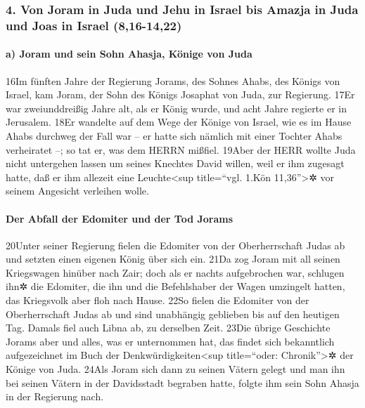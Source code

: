 \hypertarget{von-joram-in-juda-und-jehu-in-israel-bis-amazja-in-juda-und-joas-in-israel-816-1422}{%
\subsubsection{4. Von Joram in Juda und Jehu in Israel bis Amazja in
Juda und Joas in Israel
(8,16-14,22)}\label{von-joram-in-juda-und-jehu-in-israel-bis-amazja-in-juda-und-joas-in-israel-816-1422}}

\hypertarget{a-joram-und-sein-sohn-ahasja-kuxf6nige-von-juda}{%
\paragraph{a) Joram und sein Sohn Ahasja, Könige von
Juda}\label{a-joram-und-sein-sohn-ahasja-kuxf6nige-von-juda}}

16Im fünften Jahre der Regierung Jorams, des Sohnes Ahabs, des Königs
von Israel, kam Joram, der Sohn des Königs Josaphat von Juda, zur
Regierung. 17Er war zweiunddreißig Jahre alt, als er König wurde, und
acht Jahre regierte er in Jerusalem. 18Er wandelte auf dem Wege der
Könige von Israel, wie es im Hause Ahabs durchweg der Fall war -- er
hatte sich nämlich mit einer Tochter Ahabs verheiratet --; so tat er,
was dem HERRN mißfiel. 19Aber der HERR wollte Juda nicht untergehen
lassen um seines Knechtes David willen, weil er ihm zugesagt hatte, daß
er ihm allezeit eine Leuchte\textless sup title=``vgl. 1.Kön
11,36''\textgreater✲ vor seinem Angesicht verleihen wolle.

\hypertarget{der-abfall-der-edomiter-und-der-tod-jorams}{%
\paragraph{Der Abfall der Edomiter und der Tod
Jorams}\label{der-abfall-der-edomiter-und-der-tod-jorams}}

20Unter seiner Regierung fielen die Edomiter von der Oberherrschaft
Judas ab und setzten einen eigenen König über sich ein. 21Da zog Joram
mit all seinen Kriegswagen hinüber nach Zair; doch als er nachts
aufgebrochen war, schlugen ihn✲ die Edomiter, die ihn und die
Befehlshaber der Wagen umzingelt hatten, das Kriegsvolk aber floh nach
Hause. 22So fielen die Edomiter von der Oberherrschaft Judas ab und sind
unabhängig geblieben bis auf den heutigen Tag. Damals fiel auch Libna
ab, zu derselben Zeit. 23Die übrige Geschichte Jorams aber und alles,
was er unternommen hat, das findet sich bekanntlich aufgezeichnet im
Buch der Denkwürdigkeiten\textless sup title=``oder:
Chronik''\textgreater✲ der Könige von Juda. 24Als Joram sich dann zu
seinen Vätern gelegt und man ihn bei seinen Vätern in der Davidsstadt
begraben hatte, folgte ihm sein Sohn Ahasja in der Regierung nach.

